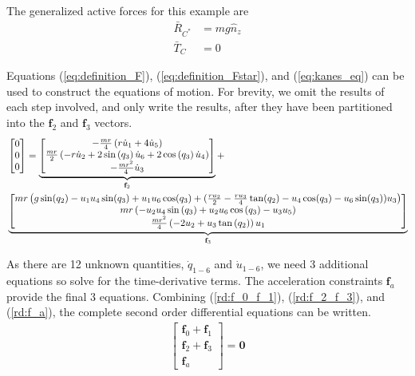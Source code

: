 \documentclass[smallcondensed,final]{svjour3}                     %
\begin{document}
The generalized active forces for this example are
\begin{align}
    \bar{R}_{C^*} &= m g \hat{n}_z \\
    \bar{T}_C &= 0
\end{align}

Equations (\ref{eq:definition_F}), (\ref{eq:definition_Fstar}), and
(\ref{eq:kanes_eq}) can be used to construct the equations of motion.
For brevity, we omit the results of each step involved, and only write the
results, after they have been partitioned into the $\mathbf{f}_2$ and
$\mathbf{f}_3$ vectors.
\begin{align}
    \label{rd:f_2_f_3}
    & \left[\begin{matrix} 0\\ 0\\ 0\end{matrix}\right] =
    \underbrace{\left[\begin{matrix}- \frac{m r}{4} \left(r \dot{u}_{1} + 4
                \dot{u}_{5}\right)\\\frac{m r}{2} \left(- r \dot{u}_{2} + 2
                \sin\left(q_{3}\right) \dot{u}_{6} + 2 \cos\left(q_{3}\right)
                \dot{u}_{4}\right)\\- \frac{m r^{2}}{4}
                \dot{u}_{3}\end{matrix}\right]}_{\mathbf{f}_2} + \notag\\
    &\underbrace{\left[\begin{matrix}
                m r \left( g \sin(q_2) - u_1 u_4 \sin(q_3) + u_1 u_6 \cos(q_3)
                    + (\frac{r u_2}{2} - \frac{r u_3}{4} \tan(q_2) - u_4
                \cos(q_3) - u_6 \sin(q_3)) u_3 \right)
                \\m r \left(- u_{2} u_{4}
                \sin\left(q_{3}\right) + u_{2} u_{6}
                \cos\left(q_{3}\right) - u_{3} u_{5}\right)\\\frac{m r^{2}}{4}
                \left(- 2 u_{2} + u_{3} \tan\left(q_{2}\right)\right)
                u_{1}\end{matrix}\right]}_{\mathbf{f}_3} 
\end{align}

As there are 12 unknown quantities, $\dot{q}_{1-6}$ and $\dot{u}_{1-6}$, we
need 3 additional equations so solve for the time-derivative terms.
The acceleration constraints $\mathbf{f}_a$ provide the final 3 equations.
Combining (\ref{rd:f_0_f_1}), (\ref{rd:f_2_f_3}), and (\ref{rd:f_a}), the
complete second order differential equations can be written.
\begin{align}
\label{rd:ode}
\begin{bmatrix} \mathbf{f}_0 + \mathbf{f}_1\\
                \mathbf{f}_2 + \mathbf{f}_3\\
                \mathbf{f}_a \end{bmatrix} = \mathbf{0}
\end{align}
\end{document}
